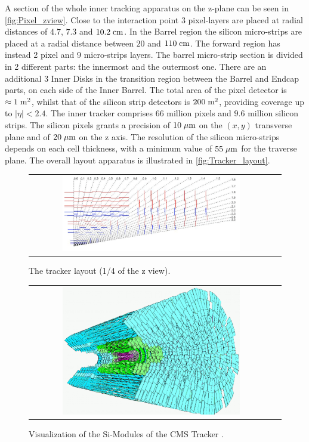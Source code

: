 A section of the whole inner tracking apparatus on the z-plane can be seen in \autoref{fig:Pixel_zview}. Close to the interaction point 3 pixel-layers are placed at radial distances of $4.7$, $7.3$ and $10.2\;\text{cm}$. In the Barrel region the silicon micro-strips are placed at a radial distance between $20$ and $110\;\text{cm}$. The forward region has instead 2 pixel and 9 micro-strips layers. The barrel micro-strip section is divided in 2 different parts: the innermost and the outermost one. There are an additional 3 Inner Disks in the transition region between the Barrel and Endcap parts, on each side of the Inner Barrel. The total area of the pixel detector is $\approx 1\;\text{m}^{2}$, whilst that of the silicon strip detectors is $200\;\text{m}^{2}$, providing coverage up to $|\eta| < 2.4$. The inner tracker comprises 66 million pixels and $9.6$ million silicon strips. The silicon pixels grants a precision of $10\;\mu\text{m}$ on the $(x,y)$ transverse plane and of $20\;\mu\text{m}$ on the z axis. The resolution of the silicon micro-strips depends on each cell thickness, with a minimum value of $ 55\;\mu\text{m}$ for the traverse plane. The overall layout apparatus is illustrated in \autoref{fig:Tracker_layout}.


\begin{figure}[tbh!]
	\centering
	\begin{tabular}{cc}
		\includegraphics[width=0.75\textwidth]{detector/pics/Pixel_zview.pdf}
	\end{tabular}
	\caption{The tracker layout (1/4 of the z view).}
	\label{fig:Pixel_zview}
\end{figure}

\begin{figure}[tbh!]
	\centering
	\begin{tabular}{cc}
		\includegraphics[width=0.75\textwidth]{detector/pics/tracker2-2.pdf}
	\end{tabular}
	\caption{Visualization of the Si-Modules of the CMS Tracker \cite{Schael:2003ca}.}
	\label{fig:Tracker_layout}
\end{figure}

